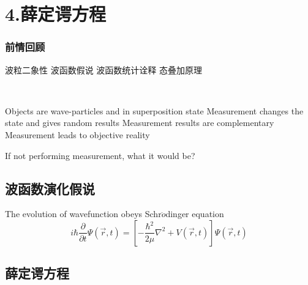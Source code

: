 
\section{4.薛定谔方程}

\begin{frame}
    \frametitle{前情回顾}
    \begin{itemize}
        \Item 波粒二象性
        \Item 波函数假说
        \Item 波函数统计诠释
        \Item 态叠加原理
    \end{itemize}
\end{frame}  

\begin{frame}
    \begin{tcolorbox4}[Conclusion]
        ~~\\
    \begin{enumerate}
        \Item Objects are wave-particles and in superposition state
        \Item Measurement changes the state and gives random results
        \Item Measurement results are complementary
        \Item Measurement leads to objective reality
    \end{enumerate}
    \end{tcolorbox4}
\end{frame}  

\begin{frame}
    \centering
    {
      If not performing measurement, what it would be? 
    }
\end{frame}

\subsection{波函数演化假说}

\begin{frame}
    \begin{tcolorbox4}
        The evolution of wavefunction obeys Schr$\ddot{o}$dinger equation
        \begin{equation*}
            i\hbar \frac{\partial }{\partial t} \Psi (\overrightarrow{r},t ) =\left [ -\frac{\hbar^2}{2\mu }\nabla ^2 + V(\overrightarrow{r},t ) \right ]\Psi (\overrightarrow{r}, t ) 
        \end{equation*}
    \end{tcolorbox4}
\end{frame}

\subsection{薛定谔方程}

